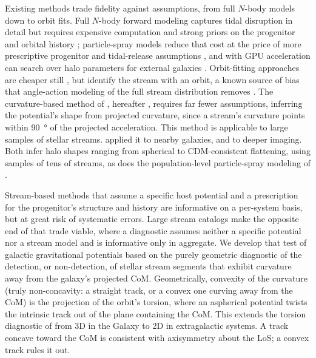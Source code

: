 \documentclass[linenumbers,twocolumn]{aastex701}
\begin{document}
    Existing methods trade fidelity against assumptions, from full $N$-body models down to orbit fits. %
    Full $N$-body forward modeling captures tidal disruption in detail but requires expensive computation and strong priors on the progenitor and orbital history \citep{Fardal+:2013:InferringAndromedaGalaxys}; %
    particle-spray models reduce that cost at the price of more prescriptive progenitor and tidal-release assumptions \citep{Fardal+:2015:GenerationMockTidal,Pearson:2022:MappingDarkMatter}, and with GPU acceleration can search over halo parameters for external galaxies \citep{Nibauer+Pearson:2026:TestingDarkMatter,Chemaly+:2026:HierarchicalBayesianInference}. %
    Orbit-fitting approaches are cheaper still \citep{Walder+:2024:ProbingDarkMatter}, but identify the stream with an orbit, a known source of bias \citep{Sanders:2013:StreamorbitMisalignmentDangers} that angle-action modeling of the full stream distribution removes \citep{Sanders:2013:StreamorbitMisalignmentII}. %
    The curvature-based method of \citet{Nibauer+:2023}, hereafter , requires far fewer assumptions, inferring the potential's shape from projected curvature, since a stream's curvature points within \qty{90}{\degree} of the projected acceleration. %
    This method is applicable to large samples of stellar streams. %
    \citet{Wu+:2026:PotamidesMappingDark} applied it to nearby galaxies, and \citet{Starkman+:2026:EuclidQ1} to deeper \euclid{} imaging. %
    Both infer halo shapes ranging from spherical to \gls{CDM}-consistent flattening, using samples of tens of streams, as does the population-level particle-spray modeling of \citet{Chemaly+:2026:ConstraintsPopulationLevel}. %

    Stream-based methods that assume a specific host potential and a prescription for the progenitor's structure and history are informative on a per-system basis, but at great risk of systematic errors. %
    Large stream catalogs make the opposite end of that trade viable, where a diagnostic assumes neither a specific potential nor a stream model and is informative only in aggregate. %
    We develop that test of galactic gravitational potentials based on the purely geometric diagnostic of the detection, or non-detection, of stellar stream segments that exhibit curvature away from the galaxy's projected \gls{CoM}. %
    Geometrically, convexity of the curvature (truly non-concavity: a straight track, or a convex one curving away from the \gls{CoM}) is the projection of the orbit's torsion, where an aspherical potential twists the intrinsic track out of the plane containing the \gls{CoM}. %
    This extends the torsion diagnostic of \citet{Bariego-Quintana:2024:TorsionStellarStreams} from 3D in the Galaxy to 2D in extragalactic systems. %
    A track concave toward the \gls{CoM} is consistent with axisymmetry about the \gls{LoS}; a convex track rules it out. %
\end{document}
